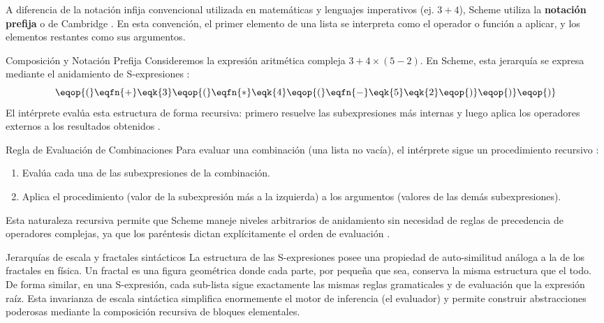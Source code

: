 A diferencia de la notación infija convencional utilizada en matemáticas y lenguajes imperativos (ej. $3 + 4$), Scheme utiliza la \textbf{notación prefija} o de Cambridge \cite{SICP, HtDP}. En esta convención, el primer elemento de una lista se interpreta como el operador o función a aplicar, y los elementos restantes como sus argumentos.

\begin{ejemplo}{Composición y Notación Prefija}
Consideremos la expresión aritmética compleja $3 + 4 \times (5 - 2)$. En Scheme, esta jerarquía se expresa mediante el anidamiento de S-expresiones \cite{SICP, HtDP}:
\begin{equation}
    \eqop{(}\eqfn{+} \eqk{3} \eqop{(}\eqfn{*} \eqk{4} \eqop{(}\eqfn{-} \eqk{5} \eqk{2}\eqop{)}\eqop{)}\eqop{)}
\end{equation}
El intérprete evalúa esta estructura de forma recursiva: primero resuelve las subexpresiones más internas y luego aplica los operadores externos a los resultados obtenidos \cite{SICP}.
\end{ejemplo}

\begin{observacion}{Regla de Evaluación de Combinaciones}
Para evaluar una combinación (una lista no vacía), el intérprete sigue un procedimiento recursivo \cite{SICP}:
\begin{enumerate}
    \item Evalúa cada una de las subexpresiones de la combinación.
    \item Aplica el procedimiento (valor de la subexpresión más a la izquierda) a los argumentos (valores de las demás subexpresiones).
\end{enumerate}
Esta naturaleza recursiva permite que Scheme maneje niveles arbitrarios de anidamiento sin necesidad de reglas de precedencia de operadores complejas, ya que los paréntesis dictan explícitamente el orden de evaluación \cite{SICP, HtDP}.
\end{observacion}

\begin{fisicaconexion}{Jerarquías de escala y fractales sintácticos}
La estructura de las S-expresiones posee una propiedad de auto-similitud análoga a la de los fractales en física. Un fractal es una figura geométrica donde cada parte, por pequeña que sea, conserva la misma estructura que el todo. De forma similar, en una S-expresión, cada sub-lista sigue exactamente las mismas reglas gramaticales y de evaluación que la expresión raíz. Esta invarianza de escala sintáctica simplifica enormemente el motor de inferencia (el evaluador) y permite construir abstracciones poderosas mediante la composición recursiva de bloques elementales.
\end{fisicaconexion}

